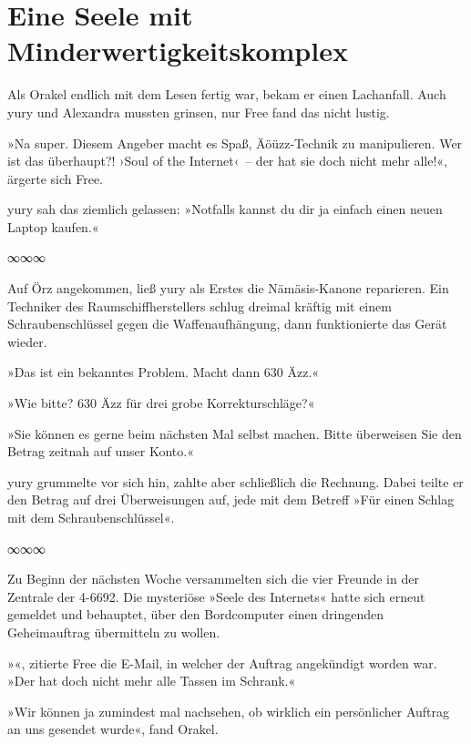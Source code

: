 
\chapter{Eine Seele mit Minderwertigkeitskomplex}

Als Orakel endlich mit dem Lesen fertig war, bekam er einen Lachanfall. Auch yury und Alexandra mussten grinsen, nur Free fand das nicht lustig.

»Na super. Diesem Angeber macht es Spaß, Äöüzz-Technik zu manipulieren. Wer ist das überhaupt?! ›Soul of the Internet‹~– der hat sie doch nicht mehr alle!«, ärgerte sich Free.

yury sah das ziemlich gelassen: »Notfalls kannst du dir ja einfach einen neuen Laptop kaufen.«

\begin{center}
    ∞∞∞
\end{center}

Auf Örz angekommen, ließ yury als Erstes die Nämäsis-Kanone reparieren. Ein Techniker des Raumschiffherstellers schlug dreimal kräftig mit einem Schraubenschlüssel gegen die Waffenaufhängung, dann funktionierte das Gerät wieder.

»Das ist ein bekanntes Problem. Macht dann 630 Äzz.«

»Wie bitte? 630 Äzz für drei grobe Korrekturschläge?«

»Sie können es gerne beim nächsten Mal selbst machen. Bitte überweisen Sie den Betrag zeitnah auf unser Konto.«

yury grummelte vor sich hin, zahlte aber schließlich die Rechnung. Dabei teilte er den Betrag auf drei Überweisungen auf, jede mit dem Betreff »Für einen Schlag mit dem Schraubenschlüssel«.

\begin{center}
    ∞∞∞
\end{center}

Zu Beginn der nächsten Woche versammelten sich die vier Freunde in der Zentrale der 4-6692. Die mysteriöse »Seele des Internets« hatte sich erneut gemeldet und behauptet, über den Bordcomputer einen dringenden Geheimauftrag übermitteln zu wollen.

»«, zitierte Free die E-Mail, in welcher der Auftrag angekündigt worden war. »Der hat doch nicht mehr alle Tassen im Schrank.«

»Wir können ja zumindest mal nachsehen, ob wirklich ein persönlicher Auftrag an uns gesendet wurde«, fand Orakel.


